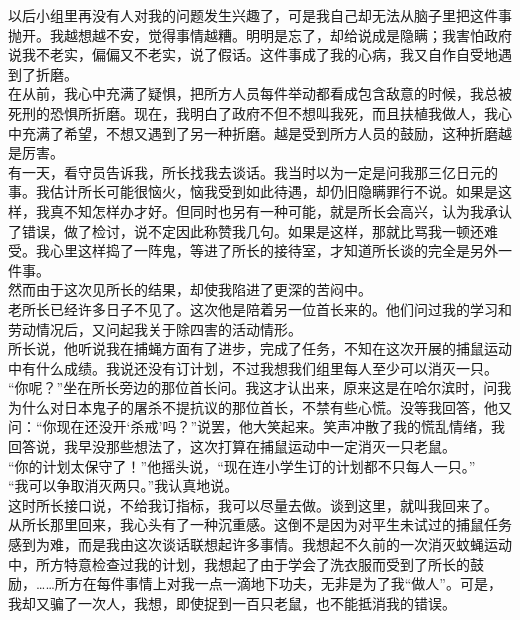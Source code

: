 以后小组里再没有人对我的问题发生兴趣了，可是我自己却无法从脑子里把这件事抛开。我越想越不安，觉得事情越糟。明明是忘了，却给说成是隐瞒；我害怕政府说我不老实，偏偏又不老实，说了假话。这件事成了我的心病，我又自作自受地遇到了折磨。\\

在从前，我心中充满了疑惧，把所方人员每件举动都看成包含敌意的时候，我总被死刑的恐惧所折磨。现在，我明白了政府不但不想叫我死，而且扶植我做人，我心中充满了希望，不想又遇到了另一种折磨。越是受到所方人员的鼓励，这种折磨越是厉害。\\

有一天，看守员告诉我，所长找我去谈话。我当时以为一定是问我那三亿日元的事。我估计所长可能很恼火，恼我受到如此待遇，却仍旧隐瞒罪行不说。如果是这样，我真不知怎样办才好。但同时也另有一种可能，就是所长会高兴，认为我承认了错误，做了检讨，说不定因此称赞我几句。如果是这样，那就比骂我一顿还难受。我心里这样捣了一阵鬼，等进了所长的接待室，才知道所长谈的完全是另外一件事。\\

然而由于这次见所长的结果，却使我陷进了更深的苦闷中。\\

老所长已经许多日子不见了。这次他是陪着另一位首长来的。他们问过我的学习和劳动情况后，又问起我关于除四害的活动情形。\\

所长说，他听说我在捕蝇方面有了进步，完成了任务，不知在这次开展的捕鼠运动中有什么成绩。我说还没有订计划，不过我想我们组里每人至少可以消灭一只。\\

“你呢？”坐在所长旁边的那位首长问。我这才认出来，原来这是在哈尔滨时，问我为什么对日本鬼子的屠杀不提抗议的那位首长，不禁有些心慌。没等我回答，他又问：“你现在还没开‘杀戒’吗？”说罢，他大笑起来。笑声冲散了我的慌乱情绪，我回答说，我早没那些想法了，这次打算在捕鼠运动中一定消灭一只老鼠。\\

“你的计划太保守了！”他摇头说，“现在连小学生订的计划都不只每人一只。”\\

“我可以争取消灭两只。”我认真地说。\\

这时所长接口说，不给我订指标，我可以尽量去做。谈到这里，就叫我回来了。\\

从所长那里回来，我心头有了一种沉重感。这倒不是因为对平生未试过的捕鼠任务感到为难，而是我由这次谈话联想起许多事情。我想起不久前的一次消灭蚊蝇运动中，所方特意检查过我的计划，我想起了由于学会了洗衣服而受到了所长的鼓励，……所方在每件事情上对我一点一滴地下功夫，无非是为了我“做人”。可是，我却又骗了一次人，我想，即使捉到一百只老鼠，也不能抵消我的错误。\\

